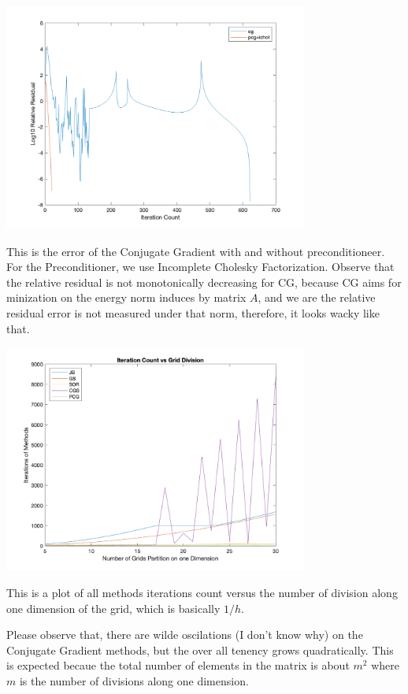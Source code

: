 \documentclass[]{article}
\begin{document}
    \begin{center}
        \includegraphics[width=10cm]{pcg_vs_cgs_itr.png}
    \end{center}
    \par
    This is the error of the Conjugate Gradient with and without preconditioneer. For the Preconditioner, we use Incomplete Cholesky Factorization. Observe that the relative residual is not monotonically decreasing for CG, because CG aims for minization on the energy norm induces by matrix $A$, and we are the relative residual error is not measured under that norm, therefore, it looks wacky like that. 
    \begin{center}
        \includegraphics[width=10cm]{h_vs_methods_itr.png}
    \end{center}
    This is a plot of all methods iterations count versus the number of division along one dimension of the grid, which is basically $1/h$. 
    \par
    Please observe that, there are wilde oscilations (I don't know why) on the Conjugate Gradient methods, but the over all tenency grows quadratically. This is expected becaue the total number of elements in the matrix is about $m^2$ where $m$ is the number of divisions along one dimension. 
\end{document}
